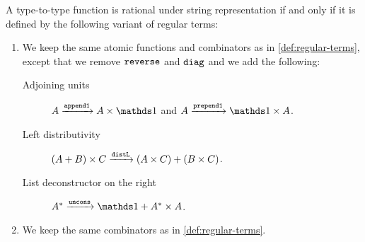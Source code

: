\begin{theorem}\label{thm:rational-terms}
    A type-to-type function is rational under string representation if and only if it is defined by the following variant of regular terms: 
    \begin{enumerate}
    \item  We keep the same atomic functions and combinators as in \cref{def:regular-terms}, except that we remove  $\mathtt{reverse}$ and $\mathtt{diag}$  and we add the following:
        \begin{description}
        \item[Adjoining units]  $A  \xrightarrow {\appendoneterm} A \times \onetype$ and $A  \xrightarrow {\prependoneterm} \onetype \times A$.
        \item[Left distributivity]  $(A + B) \times C \xrightarrow {\mathtt{distL}} (A \times C) + (B \times C)$. 
        \item[List deconstructor on the right] $A^* \xrightarrow {\unsnocterm} \onetype + A^* \times A$.
    \end{description}
    
            \item We keep the same combinators as in \cref{def:regular-terms}.
    \end{enumerate}
\end{theorem}
